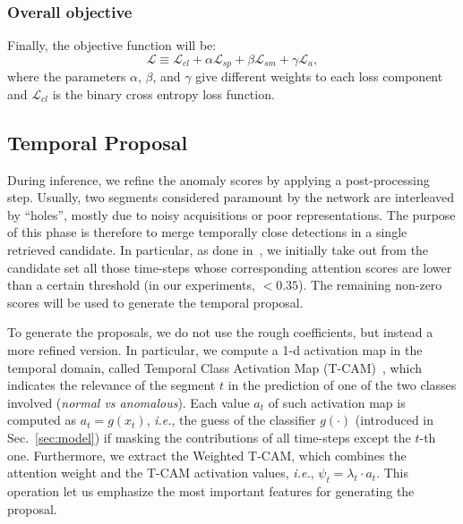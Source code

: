 \documentclass[runningheads]{llncs}
\begin{document}
\subsubsection{Overall objective} Finally, the objective function will be:
\begin{equation}
    \mathcal{L} \equiv \mathcal{L}_{cl} + \alpha \mathcal{L}_{sp} + \beta \mathcal{L}_{sm} + \gamma \mathcal{L}_{a},
\end{equation}
where the parameters $\alpha$, $\beta$, and $\gamma$ give different weights to each loss component and $ \mathcal{L}_{cl}$ is the binary cross entropy loss function.
\subsection{Temporal Proposal}
During inference, we refine the anomaly scores by applying a post-processing step. Usually, two segments considered paramount by the network are interleaved by ``holes'', mostly due to noisy acquisitions or poor representations. The purpose of this phase is therefore to merge temporally close detections in a single retrieved candidate. In particular, as done in~\cite{zhou2016learning}, we initially take out from the candidate set all those time-steps whose corresponding attention scores are lower than a certain threshold (in our experiments, $< 0.35$). The remaining non-zero scores will be used to generate the temporal proposal. 

To generate the proposals, we do not use the rough coefficients, but instead a more refined version. In particular, we compute a 1-d activation map in the temporal domain, called Temporal Class Activation Map (T-CAM)~\cite{zhou2016learning}, which indicates the relevance of the segment $t$ in the prediction of one of the two classes involved (\textit{normal vs anomalous}). Each value $a_t$ of such activation map is computed as $a_t = g(x_t)$, \textit{i.e.}, the guess of the classifier $g(\cdot)$ (introduced in Sec.~\ref{sec:model}) if masking the contributions of all time-steps except the $t$-th one. Furthermore, we extract the Weighted T-CAM, which combines the attention weight and the T-CAM activation values, \textit{i.e.}, $\psi_t = \lambda_t \cdot a_t$. This operation let us emphasize the most important features for generating the proposal.
\end{document}
